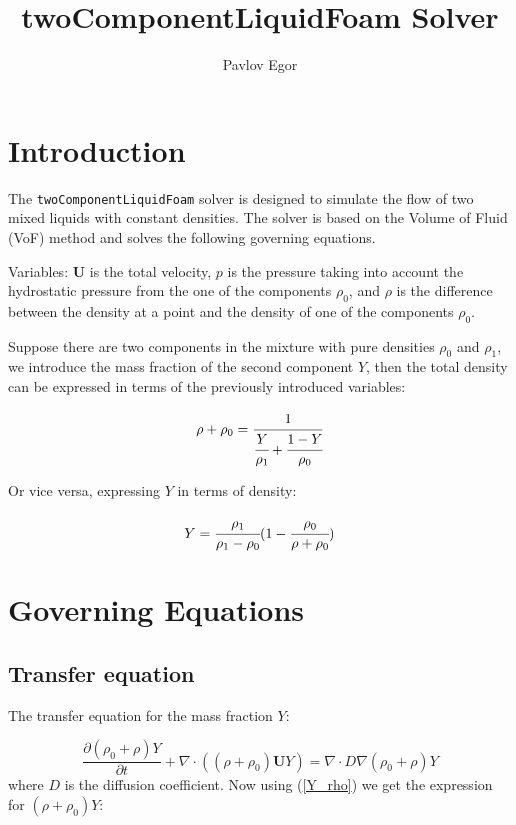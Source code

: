 \documentclass{article}
\title{twoComponentLiquidFoam Solver}
\author{Pavlov Egor}
\begin{document}
\maketitle
\section{Introduction}
The \texttt{twoComponentLiquidFoam} solver is designed to simulate the flow of two mixed liquids with constant densities. The solver is based on the Volume of Fluid (VoF) method and solves the following governing equations.

Variables: $\mathbf{U}$ is the total velocity, $p$ is the pressure taking into account the hydrostatic pressure from the one of the components $\rho_0$, and $\rho$ is the difference between the density at a point and the density of one of the components $\rho_0$.

Suppose there are two components in the mixture with pure densities $\rho_0$ 
and $\rho_1$, we introduce the mass fraction of the second component $Y$, 
then the total density can be expressed in terms of the previously 
introduced variables:

\begin{equation}
    \rho + \rho_0 = \cfrac{1}{\cfrac{Y}{\rho_1} + \cfrac{1 - Y}{\rho_0}}
\end{equation}

Or vice versa, expressing $Y$ in terms of density:

\begin{equation}\label{Y_rho}
    Y = \cfrac{\rho_1}{\rho_1 - \rho_0} (1 - \cfrac{\rho_0}{\rho + \rho_0})
\end{equation}

\section{Governing Equations}

\subsection{Transfer equation}

The transfer equation for the mass fraction $Y$:

\begin{equation}\label{YEqn}
    \frac{\partial (\rho_0 + \rho) Y}{\partial t} + \nabla \cdot ( (\rho + \rho_0) \mathbf{U} Y) = \nabla \cdot D \nabla (\rho_0 + \rho) Y
\end{equation}
where $D$ is the diffusion coefficient. Now using (\ref{Y_rho}) we get the expression for $(\rho + \rho_0) Y$:
\end{document}
